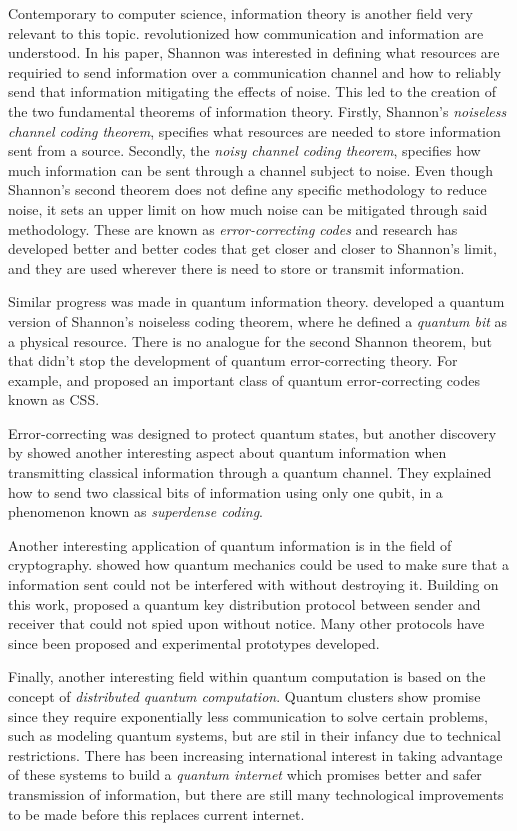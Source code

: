 \documentclass[../../dissertation.tex]{subfiles}
\begin{document}
Contemporary to computer science, information theory is another field very relevant to this topic. \cite{shannon48} revolutionized how communication and information are understood. In his paper, Shannon was interested in defining what resources are requiried to send information over a communication channel and how to reliably send that information mitigating the effects of noise. This led to the creation of the two fundamental theorems of information theory. Firstly, Shannon's \textit{noiseless channel coding theorem}, specifies what resources are needed to store information sent from a source. Secondly, the \textit{noisy channel coding theorem}, specifies how much information can be sent through a channel subject to noise. Even though Shannon's second theorem does not define any specific methodology to reduce noise, it sets an upper limit on how much noise can be mitigated through said methodology. These are known as \textit{error-correcting codes} and research has developed better and better codes that get closer and closer to Shannon's limit, and they are used wherever there is need to store or transmit information.\par
Similar progress was made in quantum information theory. \cite{schumacher95} developed a quantum version of Shannon's noiseless coding theorem, where he defined a \textit{quantum bit} as a physical resource. There is no analogue for the second Shannon theorem, but that didn't stop the development of quantum error-correcting theory. For example, \cite{shorcalder96} and \cite{steane96} proposed an important class of quantum error-correcting codes known as CSS.\par
Error-correcting was designed to protect quantum states, but another discovery by \cite{wisnerbennet92} showed another interesting aspect about quantum information when transmitting classical information through a quantum channel. They explained how to send two classical bits of information using only one qubit, in a phenomenon known as \textit{superdense coding}.\par 
Another interesting application of quantum information is in the field of cryptography. \cite{wisner60} showed how quantum mechanics could be used to make sure that a information sent could not be interfered with without destroying it. Building on this work, \cite{bennetbassard84} proposed a quantum key distribution protocol between sender and receiver that could not spied upon without notice. Many other protocols have since been proposed and experimental prototypes developed.\par
Finally, another interesting field within quantum computation is based on the concept of \textit{distributed quantum computation}. Quantum clusters show promise since they require exponentially less communication to solve certain problems, such as modeling quantum systems, but are stil in their infancy due to technical restrictions. There has been increasing international interest in taking advantage of these systems to build a \textit{quantum internet} which promises better and safer transmission of information, but there are still many technological improvements to be made before this replaces current internet. 
\end{document}
